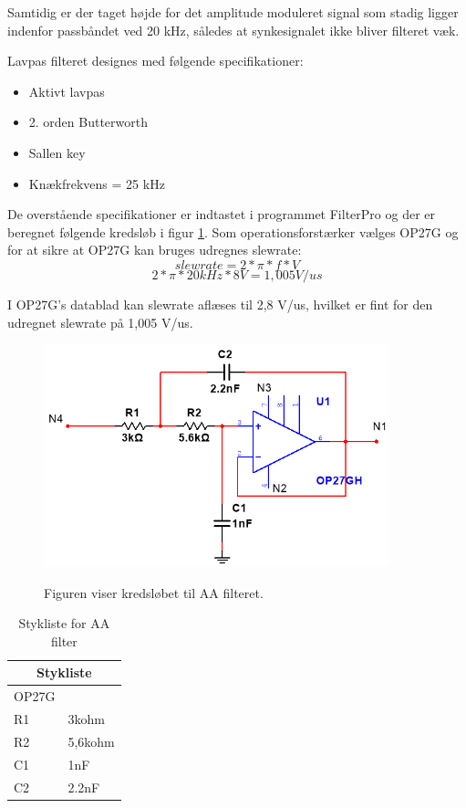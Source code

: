 Samtidig er der taget højde for det amplitude moduleret signal som stadig ligger indenfor passbåndet ved 20 kHz, således at synkesignalet ikke bliver filteret væk.

Lavpas filteret designes med følgende specifikationer:
\begin{itemize}
\item Aktivt lavpas
\item 2. orden Butterworth 
\item Sallen key
\item Knækfrekvens = 25 kHz
\end{itemize}

De overstående specifikationer er indtastet i programmet FilterPro og der er beregnet følgende kredsløb i figur \ref{Fig:aafilterdiagram}. Som operationsforstærker vælges OP27G og for at sikre at OP27G kan bruges udregnes slewrate:
$$slewrate=2*\pi*f*V$$
$$2*\pi*20kHz*8V=1,005V/us$$

I OP27G's datablad kan slewrate aflæses til 2,8 V/us, hvilket er fint for den udregnet slewrate på 1,005 V/us. 

\begin{figure}[H]
\centering
{\includegraphics[width=10cm]
{Figure/aafilterdiagram}}
\caption{Figuren viser kredsløbet til AA filteret.}
\label{Fig:aafilterdiagram}
\end{figure} 



\begin{table}[H]
\centering
\caption{Stykliste for AA filter}
\label{Styklisteaafilter}
\begin{tabular}{|l|l|}
\hline
\multicolumn{2}{|c|}{\textbf{Stykliste}} \\ \hline
OP27G             &                    \\ \hline
R1             &         3kohm  			\\ \hline
R2             &           5,6kohm         \\ \hline
C1             &           1nF         \\ \hline
C2             &           2.2nF         \\ \hline

\end{tabular}
\end{table}

